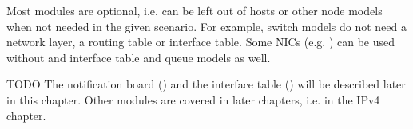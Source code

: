 Most modules are optional, i.e. can be left out of hosts or other node
models when not needed in the given scenario. For example, switch models do
not need a network layer, a routing table or interface table. Some NICs (e.g.
) can be used without and interface table and queue models as
well.

\ifdraft TODO
The notification board () and the interface
table () will be described later in this chapter.
Other modules are covered in later chapters, i.e. 
in the IPv4 chapter.
\fi






